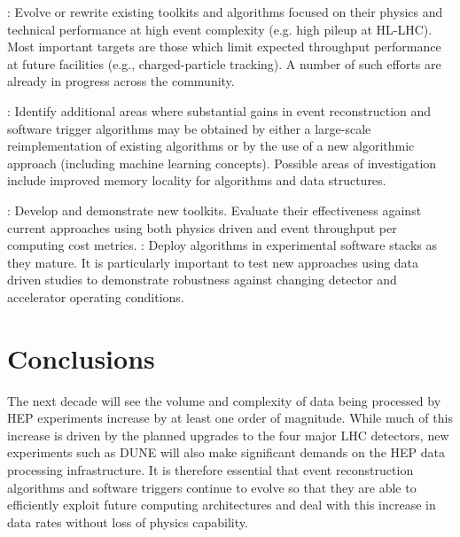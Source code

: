 \vskip 0.5cm
: Evolve or rewrite existing toolkits and algorithms focused on their physics and technical performance at high event complexity (e.g. high pileup at HL-LHC). Most 
important targets are those which limit expected throughput performance at future facilities (e.g., charged-particle tracking). A number of such efforts are already in progress across the community.

\vskip 0.5cm
: Identify additional areas where substantial gains in event reconstruction and software trigger algorithms may be obtained by either a large-scale reimplementation 
of existing algorithms or by the use of a new algorithmic approach (including machine learning concepts). Possible areas of investigation include improved memory locality for algorithms and data structures.

\vskip 0.5cm
: Develop and demonstrate new toolkits. Evaluate their effectiveness against current approaches using both physics driven and event throughput per computing cost metrics. 
\vskip 0.5cm
: Deploy algorithms in experimental software stacks as they mature. It is particularly important to test new approaches using data driven studies to demonstrate 
robustness against changing detector and accelerator operating conditions.

\section{Conclusions}

The next decade will see the volume and complexity of data being processed by HEP experiments increase by at least one order of magnitude. While much of this increase is driven by the planned 
upgrades to the four major LHC detectors, new experiments such as DUNE will also make significant demands on the HEP data processing infrastructure. It is therefore essential that event reconstruction 
algorithms and software triggers continue to evolve so that they are able to efficiently exploit future computing architectures and deal with this increase in data rates without loss of physics capability. 

